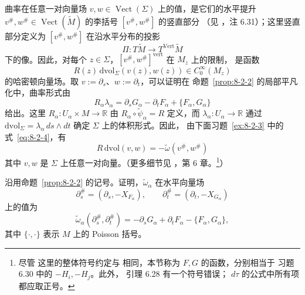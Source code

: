 曲率在任意一对向量场 $v,w\in\operatorname{Vect}(\Sigma)$ 上的值，是它们的水平提升
$v^\#,w^\#\in\operatorname{Vect}(\widetilde M)$ 的李括号 $[v^\#,w^\#]$ 的竖直部分
（见 ，注 6.31）；这里竖直部分定义为 $[v^\#,w^\#]$ 在沿水平分布的投影
\[
  \Pi:T\widetilde M\longrightarrow T^{\mathrm{Vert}}\widetilde M
\]
下的像。因此，对每个 $z\in\Sigma$，$[v^\#,w^\#]^{\mathrm{vert}}$ 在 $M_z$ 上的限制，
是函数
\[
  R(z)\,\mathrm{dvol}_\Sigma(v(z),w(z))\in C_0^\infty(M_z)
\]
的哈密顿向量场。取 $v:=\partial_s$、$w:=\partial_t$，可以证明在
命题~\ref{prop:8-2-2} 的局部平凡化中，曲率形式由
\[
  R_\alpha\lambda_\alpha
  =\partial_sG_\alpha-\partial_tF_\alpha+\{F_\alpha,G_\alpha\}
\]
给出。这里 $R_\alpha:U_\alpha\times M\to\mathbb R$ 由
$R_\alpha\circ\widetilde\psi_\alpha=R$ 定义，而
$\lambda_\alpha:U_\alpha\to\mathbb R$ 通过
$\mathrm{dvol}_\Sigma=\lambda_\alpha\,ds\wedge dt$ 确定 $\Sigma$ 上的体积形式。因此，
由下面习题~\ref{ex:8-2-3} 中的式~\eqref{eq:8-2-4}，有
\begin{equation}\label{eq:8-2-3}
  R\,\mathrm{dvol}(v,w)=-\widetilde\omega(v^\#,w^\#)
\end{equation}
其中 $v,w$ 是 $\Sigma$ 上任意一对向量。（更多细节见 ，第 6 章。\footnote{尽管
这里的整体符号约定与  相同，本节称为 $F,G$ 的函数，分别相当于
 习题 6.30 中的 $-H_i,-H_j$。此外， 引理 6.28 有一个符号错误；
$d\tau$ 的公式中所有项都应取正号。}）

\begin{exercise}\label{ex:8-2-3}
沿用命题~\ref{prop:8-2-2} 的记号。证明，$\widetilde\omega_\alpha$ 在水平向量场
\[
  \partial_s^\#=(\partial_s,-X_{F_\alpha}),
  \qquad
  \partial_t^\#=(\partial_t,-X_{G_\alpha})
\]
上的值为
\begin{equation}\label{eq:8-2-4}
  \widetilde\omega_\alpha(\partial_s^\#,\partial_t^\#)
  =-\partial_sG_\alpha+\partial_tF_\alpha-\{F_\alpha,G_\alpha\},
\end{equation}
其中 $\{\mathord\cdot,\mathord\cdot\}$ 表示 $M$ 上的 Poisson 括号。
\end{exercise}

